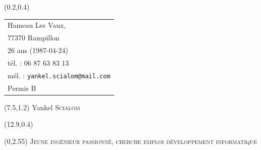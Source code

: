 \documentclass[10pt]{article}
\newcommand{\emphcolor}{NavyBlue}
\newcommand{\cemph}[1]{{\color{\emphcolor} #1}}
\begin{document}
\thispagestyle{empty}

\begin{textblock}{7}(0.2,0.4)
	\begin{tabular}{l}
		\small
		Hameau Les Vaux,\\ 77370 Rampillon\\
		26 ans (1987-04-24)\\
		tél. : 06 87 63 83 13\\
		mél. : \texttt{yankel.scialom@mail.com}\\
		Permis B
	\end{tabular}
\end{textblock}

\begin{textblock}{7}(7.5,1.2)
	{\Huge Yankel \textsc{Scialom}}
	
	\vspace{1em}
\end{textblock}

\begin{textblock}{7}(12.9,0.4)
	{\color{\emphcolor}}
\end{textblock}


\begin{textblock}{16}(0,2.55)
	\centering
	\fontsize{15pt}{18pt}\selectfont
	\cemph{\textsc{Jeune ingénieur passionné, cherche emploi développement informatique}}
\end{textblock}
\end{document}

